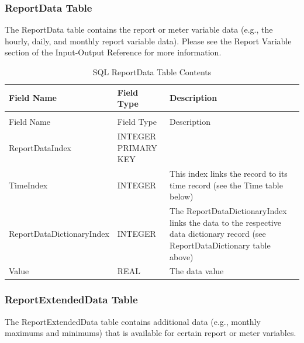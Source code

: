 \subsubsection{ReportData Table}

The ReportData table contains the report or meter variable data (e.g., the hourly, daily, and monthly report variable data). Please see the Report Variable section of the Input-Output Reference for more information.

{\scriptsize
\begin{longtable}[c]{>{\raggedright}p{1.5in}>{\raggedright}p{1.5in}>{\raggedright}p{3.0in}}
\caption{SQL ReportData Table Contents \label{table:table-8.-sql-reportdata-table-contents}} \tabularnewline
\toprule
Field Name & Field Type & Description \tabularnewline
\midrule
\endfirsthead

\caption[]{SQL ReportData Table Contents} \tabularnewline
\toprule
Field Name & Field Type & Description \tabularnewline
\midrule
\endhead

ReportDataIndex & INTEGER PRIMARY KEY &  \tabularnewline
TimeIndex & INTEGER & This index links the record to its time record (see the Time table below) \tabularnewline
ReportData\-Dictionary\-Index & INTEGER & The ReportDataDictionaryIndex links the data to the respective data dictionary record (see ReportDataDictionary table above) \tabularnewline
Value & REAL & The data value \tabularnewline
\bottomrule
\end{longtable}}

\subsubsection{ReportExtendedData Table}

The ReportExtendedData table contains additional data (e.g., monthly maximums and minimums) that is available for certain report or meter variables.

